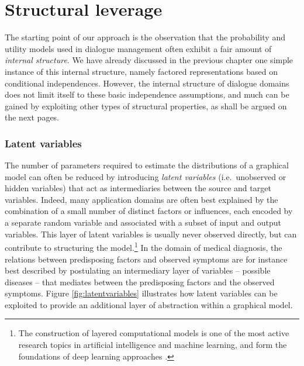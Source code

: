 \section{Structural leverage}
\label{sec:rmotivation}

The starting point of our approach is the observation that the probability and utility models used in dialogue management often exhibit a fair amount of \textit{internal structure}.  
We have already discussed in the previous chapter one simple instance of this internal structure, namely factored representations based on conditional independences. However, the internal structure of dialogue domains does not limit itself to these basic independence assumptions, and much can be gained by exploiting other types of structural properties, as shall be argued on the next pages. 



\subsubsection*{Latent variables}
The number of parameters required to estimate the distributions of a graphical model can often be reduced by introducing \textit{latent variables} (i.e.\ unobserved or hidden variables) that act as intermediaries between the source and target variables. Indeed, many application domains are often best explained by the combination of a small number of distinct factors or influences, each encoded by a separate random variable and associated with a subset of input and output variables. This layer of latent variables is usually never observed directly, but can contribute to structuring the model.\footnote{The construction of layered computational models is one of the most active research topics in artificial intelligence and machine learning, and form the foundations of deep learning approaches \citep{Bengio:2009}.} In the domain of medical diagnosis, the relations between predisposing factors and observed symptoms are for instance best described by postulating an intermediary layer of variables -- possible diseases -- that mediates between the predisposing factors and the observed symptoms.  Figure \ref{fig:latentvariables} illustrates how latent variables can be exploited to provide an additional layer of abstraction within a graphical model.

